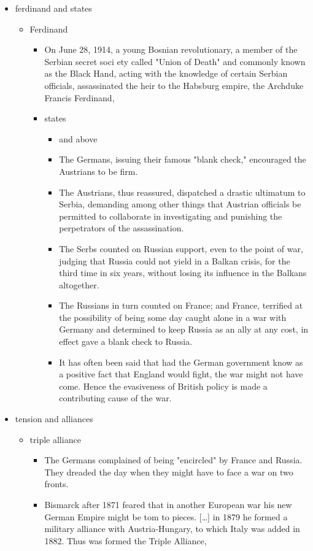 \documentclass[letterpaper]{article}
\begin{document}
\begin{itemize}
\item ferdinand and states

\begin{itemize}
\item Ferdinand

\begin{itemize}
\item On June 28, 1914, a young Bosnian revolutionary, a member of the
Serbian secret soci ety called "Union of Death" and commonly known
as the Black Hand, acting with the knowledge of certain Serbian
officials, assassinated the heir to the Habsburg empire, the
Archduke Francis Ferdinand,
\item states

\begin{itemize}
\item and above
\item The Germans, issuing their famous "blank check," encouraged the
Austrians to be firm.
\item The Austrians, thus reassured, dispatched a drastic ultimatum to
Serbia, demanding among other things that Austrian officials be
permitted to collaborate in investigating and punishing the
perpetrators of the assassination.
\item The Serbs counted on Russian support, even to the point of war,
judging that Russia could not yield in a Balkan crisis, for the
third time in six years, without losing its influence in the
Balkans altogether.
\item The Russians in turn counted on France; and France, terrified at
the possibility of being some day caught alone in a war with
Germany and determined to keep Russia as an ally at any cost, in
effect gave a blank check to Russia.
\item It has often been said that had the German government know as a
positive fact that England would fight, the war might not have
come. Hence the evasiveness of British policy is made a
contributing cause of the war.
\end{itemize}
\end{itemize}
\end{itemize}

\item tension and alliances

\begin{itemize}
\item triple alliance

\begin{itemize}
\item The Germans complained of being "encircled" by France and Russia.
They dreaded the day when they might have to face a war on two
fronts.\\
\item Bismarck after 1871 feared that in another European war his new
German Empire might be tom to pieces. [\ldots{}] in 1879 he formed a
military alliance with Austria-Hungary, to which Italy was added
in 1882. Thus was formed the Triple Alliance,
\end{itemize}


\end{itemize}
\end{itemize}
\end{document}
